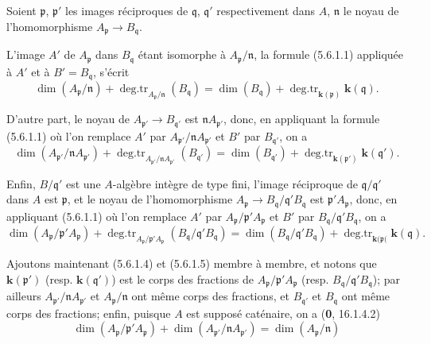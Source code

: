 Soient $\mathfrak p$, $\mathfrak p'$ les images réciproques de
$\mathfrak q$, $\mathfrak q'$ respectivement dans $A$, $\mathfrak n$ le
noyau de l'homomorphisme $A_{\mathfrak p}\to B_{\mathfrak q}$.

L'image $A'$ de $A_{\mathfrak p}$ dans $B_{\mathfrak q}$ étant isomorphe à
$A_{\mathfrak p}/\mathfrak n$, la formule (5.6.1.1) appliquée à $A'$ et à
$B'=B_{\mathfrak q}$, s'écrit
\begin{equation}
\dim(A_{\mathfrak p}/\mathfrak n)
+\operatorname{deg.tr}_{A_{\mathfrak p}/\mathfrak n}(B_{\mathfrak q})
=\dim(B_{\mathfrak q})
+\operatorname{deg.tr}_{\mathbf{k}(\mathfrak p)}\boldsymbol{k}(\mathfrak q).
\tag{5.6.1.3}\label{IV.2.s5.6.1.3-fr}
\end{equation}

D'autre part, le noyau de $A_{\mathfrak p'}\to B_{\mathfrak q'}$ est
$\mathfrak nA_{\mathfrak p'}$, donc, en appliquant la formule (5.6.1.1) où
l'on remplace $A'$ par $A_{\mathfrak p'}/\mathfrak nA_{\mathfrak p'}$ et
$B'$ par $B_{\mathfrak q'}$, on a
\begin{equation}
\dim(A_{\mathfrak p'}/\mathfrak nA_{\mathfrak p'})
+\operatorname{deg.tr}_{A_{\mathfrak p'}/\mathfrak nA_{\mathfrak p'}}
(B_{\mathfrak q'})
=\dim(B_{\mathfrak q'})
+\operatorname{deg.tr}_{\mathbf{k}(\mathfrak p')}\boldsymbol{k}(\mathfrak q').
\tag{5.6.1.4}\label{IV.2.s5.6.1.4-fr}
\end{equation}

Enfin, $B/\mathfrak q'$ est une $A$-algèbre intègre de type fini, l'image
réciproque de $\mathfrak q/\mathfrak q'$ dans $A$ est $\mathfrak p$, et le
noyau de l'homomorphisme
$A_{\mathfrak p}\to B_{\mathfrak q}/\mathfrak q'B_{\mathfrak q}$ est
$\mathfrak p'A_{\mathfrak p}$, donc, en appliquant (5.6.1.1) où l'on
remplace $A'$ par $A_{\mathfrak p}/\mathfrak p'A_{\mathfrak p}$ et $B'$ par
$B_{\mathfrak q}/\mathfrak q'B_{\mathfrak q}$, on a
\begin{equation}
\dim(A_{\mathfrak p}/\mathfrak p'A_{\mathfrak p})
+\operatorname{deg.tr}_{A_{\mathfrak p}/\mathfrak p'A_{\mathfrak p}}
(B_{\mathfrak q}/\mathfrak q'B_{\mathfrak q})
=\dim(B_{\mathfrak q}/\mathfrak q'B_{\mathfrak q})
+\operatorname{deg.tr}_{\mathbf{k}(\mathfrak p(}\boldsymbol{k}(\mathfrak q).
\tag{5.6.1.5}\label{IV.2.s5.6.1.5-fr}
\end{equation}

Ajoutons maintenant (5.6.1.4) et (5.6.1.5) membre à membre, et notons que
$\boldsymbol{k}(\mathfrak p')$ (resp. $\boldsymbol{k}(\mathfrak q')$) est le corps des fractions de
$A_{\mathfrak p}/\mathfrak p'A_{\mathfrak p}$ (resp.
$B_{\mathfrak q}/\mathfrak q'B_{\mathfrak q}$); par ailleurs
$A_{\mathfrak p'}/\mathfrak nA_{\mathfrak p'}$ et
$A_{\mathfrak p}/\mathfrak n$ ont même corps des fractions, et
$B_{\mathfrak q'}$ et $B_{\mathfrak q}$ ont même corps des fractions;
enfin, puisque $A$ est supposé caténaire, on a (\textbf{0}, 16.1.4.2)
\[
\dim(A_{\mathfrak p}/\mathfrak p'A_{\mathfrak p})
+\dim(A_{\mathfrak p'}/\mathfrak nA_{\mathfrak p'})
=\dim(A_{\mathfrak p}/\mathfrak n)
\]

